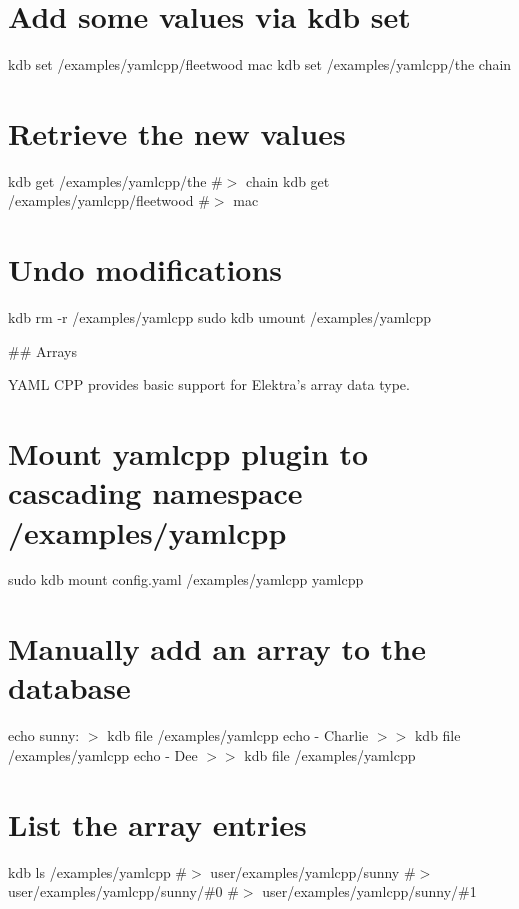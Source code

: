 \section*{Add some values via {\ttfamily kdb set}}

kdb set /examples/yamlcpp/fleetwood mac kdb set /examples/yamlcpp/the chain

\section*{Retrieve the new values}

kdb get /examples/yamlcpp/the \#$>$ chain kdb get /examples/yamlcpp/fleetwood \#$>$ mac

\section*{Undo modifications}

kdb rm -\/r /examples/yamlcpp sudo kdb umount /examples/yamlcpp 
\begin{DoxyCode}
## Arrays

YAML CPP provides basic support for Elektra’s array data type.
\end{DoxyCode}
 \section*{Mount yamlcpp plugin to cascading namespace {\ttfamily /examples/yamlcpp}}

sudo kdb mount config.\+yaml /examples/yamlcpp yamlcpp

\section*{Manually add an array to the database}

echo \textquotesingle{}sunny\+:\textquotesingle{} $>$ {\ttfamily kdb file /examples/yamlcpp} echo \textquotesingle{} -\/ Charlie\textquotesingle{} $>$$>$ {\ttfamily kdb file /examples/yamlcpp} echo \textquotesingle{} -\/ Dee\textquotesingle{} $>$$>$ {\ttfamily kdb file /examples/yamlcpp}

\section*{List the array entries}

kdb ls /examples/yamlcpp \#$>$ user/examples/yamlcpp/sunny \#$>$ user/examples/yamlcpp/sunny/\#0 \#$>$ user/examples/yamlcpp/sunny/\#1

